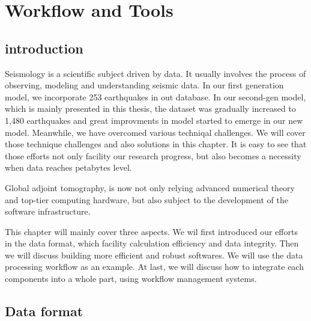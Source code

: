 \chapter{Workflow and Tools}
\label{ch:tools}

\section{introduction}

Seismology is a scientific subject driven by data. It usually involves the process
of observing, modeling and understanding seismic data. In our first generation
model, we incorporate 253 earthquakes in out database. In our second-gen
model, which is mainly presented in this thesis, the dataset was gradually
increased to 1,480 earthquakes and great improvments in model started to
emerge in our new model. Meanwhile, we have overcomed various techniqal
challenges. We will cover those technique challenges and also solutions
in this chapter. It is easy to see that those efforts not only facility
our research progress, but also becomes a necessity when data reaches
petabytes level.

Global adjoint tomography, is now not only relying advanced
numerical theory and top-tier computing hardware, but also subject to 
the development of the software infrastructure.

This chapter will mainly cover three aspects. We wil first introduced
our efforts in the data format, which facility calculation efficiency
and data integrity. Then we will discuss building more efficient
and robust softwares. We will use the data processing workflow as an
example. At last, we will discuss how to integrate each components
into a whole part, using workflow management systems.


\section{Data format}

